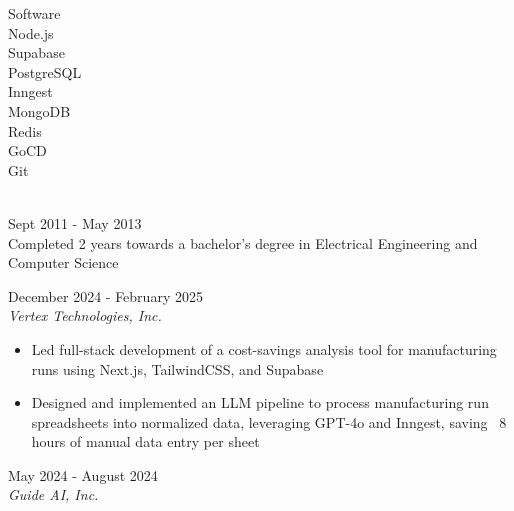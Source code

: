 \documentclass{resume}
\begin{document}
\begin{spacing}{1.2}
\begin{paracol}{2}
\begin{flushright}
\begin{spacing}{1.1}
				\medskip

				{\color{subcontent} \footnotesize Software}\\
				\smallskip
				Node.js\\
				Supabase\\
				PostgreSQL\\
				Inngest\\
				MongoDB\\
				Redis\\
				GoCD\\
				Git

				\bigskip

				\small {}

				{\large{}}\\
				{\color{subcontent} Sept 2011 - May 2013}\\
				Completed 2 years towards a bachelor's degree in Electrical Engineering and Computer Science
			\end{spacing}
		\end{flushright}

		\switchcolumn
		\small {}
		
		{\large{}}
		\hfill{\color{subcontent} December 2024 - February 2025}\\
		\textit{Vertex Technologies, Inc.}
		
		\nointerlineskip
		\begin{itemize}
			\item Led full-stack development of a cost-savings analysis tool for manufacturing runs using Next.js, TailwindCSS, and Supabase
			\item Designed and implemented an LLM pipeline to process manufacturing run spreadsheets into normalized data, leveraging GPT-4o and Inngest, saving ~8 hours of manual data entry per sheet
		\end{itemize}

		\medskip

		{\large{}}
		\hfill{\color{subcontent} May 2024 - August 2024}\\
		\textit{Guide AI, Inc.}
		

\end{paracol}
\end{spacing}
\end{document}
